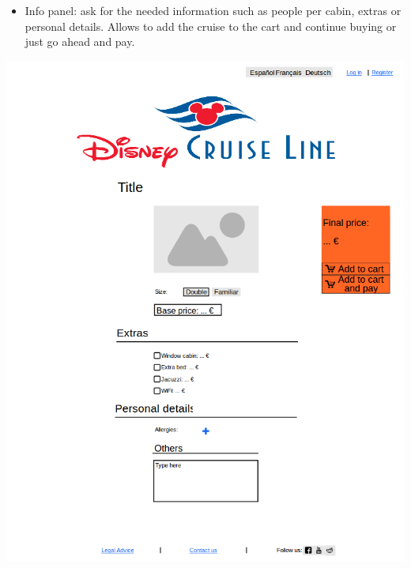 \documentclass[11pt]{article}
\begin{document}
	\begin{qn}
		\begin{itemize}
			\item Info panel: ask for the needed information such as people per cabin, extras or personal details. Allows to add the cruise to the cart and continue buying or just go ahead and pay.
		\end{itemize}
			\begin{center}
			\begin{minipage}{0.5\linewidth}
				\includegraphics[width=\linewidth]{images/mockup4.png}
				\label{fig:mockup4}
			\end{minipage}
		\end{center}
	\end{qn}
\end{document}

